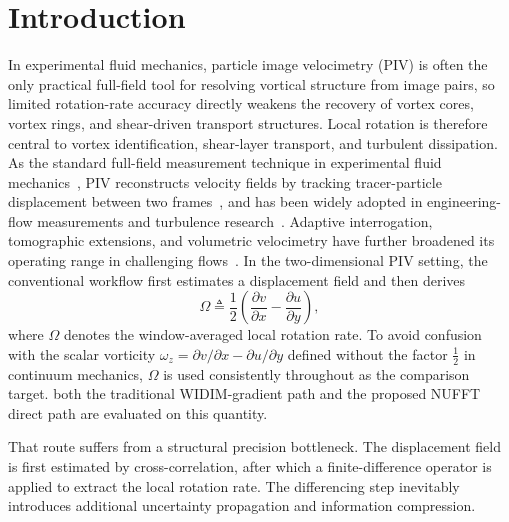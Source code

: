 \documentclass[lettersize,journal]{IEEEtran}
\begin{document}
\section{Introduction}
\label{sec:intro}

In experimental fluid mechanics, particle image velocimetry (PIV) is often the only practical full-field tool for resolving vortical structure from image pairs, so limited rotation-rate accuracy directly weakens the recovery of vortex cores, vortex rings, and shear-driven transport structures.
Local rotation is therefore central to vortex identification, shear-layer transport, and turbulent dissipation.
As the standard full-field measurement technique in experimental fluid mechanics~\cite{Adrian1991,Raffel2018,Westerweel2013},
PIV reconstructs velocity fields by tracking tracer-particle displacement between two frames~\cite{Westerweel1997,Keane1990},
and has been widely adopted in engineering-flow measurements and turbulence research~\cite{Stanislas2005}.
Adaptive interrogation, tomographic extensions, and volumetric velocimetry have further broadened its operating range in challenging flows~\cite{Theunissen2007,Elsinga2006,Discetti2018}.
In the two-dimensional PIV setting, the conventional workflow first estimates a displacement field
and then derives
\begin{equation}
  \Omega \triangleq \frac{1}{2}\!\left(\frac{\partial v}{\partial x}
  - \frac{\partial u}{\partial y}\right),
  \label{eq:rot_rate_def}
\end{equation}
where $\Omega$ denotes the window-averaged local rotation rate.
To avoid confusion with the scalar vorticity
$\omega_z=\partial v/\partial x-\partial u/\partial y$ defined without the factor $\tfrac{1}{2}$ in continuum mechanics,
$\Omega$ is used consistently throughout as the comparison target.
both the traditional WIDIM-gradient path and the proposed NUFFT direct path are evaluated on this quantity.

That route suffers from a structural precision bottleneck.
The displacement field is first estimated by cross-correlation, after which a finite-difference operator is applied to extract the local rotation rate.
The differencing step inevitably introduces additional uncertainty propagation and information compression.
\end{document}
